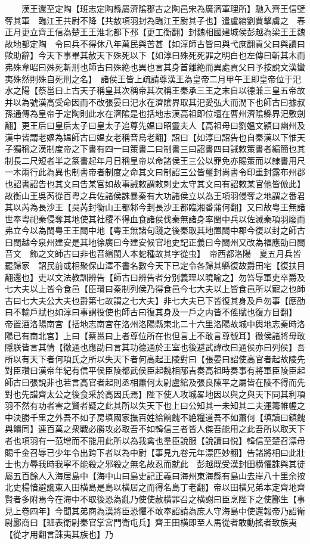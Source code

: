　　漢王還至定陶【班志定陶縣屬濟隂郡古之陶邑宋為廣濟軍理所】馳入齊王信壁奪其軍　臨江王共尉不降【共敖項羽封為臨江王尉其子也】遣盧綰劉賈擊虜之　春正月更立齊王信為楚王王淮北都下邳【更工衡翻】封魏相國建城侯彭越為梁王王魏故地都定陶　令曰兵不得休八年萬民與苦甚【如淳師古皆曰與弋庶翻貢父曰與讀曰歟助辭】今天下事畢其赦天下殊死以下【如淳曰殊死死罪之明白也左傳曰斬其木而弗殊韋昭曰殊死斬刑也師古曰殊絶也異也言其身首離絶而異處貢父曰予按說文漢蠻夷殊然則殊自死刑之名】　諸侯王皆上疏請尊漢王為皇帝二月甲午王即皇帝位于汜水之陽【蔡邕曰上古天子稱皇其次稱帝其次稱王秦承三王之末自以德兼三皇五帝故并以為號漢高受命因而不改張晏曰汜水在濟隂界取其汜愛弘大而潤下也師古曰據叔孫通傳為皇帝于定陶則此水在濟隂是也括地志漢高祖即位壇在曹州濟隂縣界汜敷劍翻】更王后曰皇后太子曰皇太子追尊先媪曰昭靈夫人【高祖母曰劉媼文頴曰幽州及漢中皆謂老嫗為媪師古曰媪女老稱音烏老翻】詔曰【如淳曰詔告也自秦漢以下惟天子獨稱之漢制度帝之下書有四一曰策書二曰制書三曰詔書四曰誡敕策書者編簡也其制長二尺短者半之篆書起年月日稱皇帝以命諸侯王三公以罪免亦賜策而以隸書用尺一木兩行此為異也制書帝者制度之命其文曰制詔三公皆璽封尚書令印重封露布州郡也詔書詔告也其文曰告某官如故事誡敕謂敕刺史太守其文曰有詔敕某官他皆倣此】故衡山王吳芮從百粤之兵佐諸侯誅暴秦有大功諸侯立以為王項羽侵奪之地謂之番君其以芮為長沙王【吳芮封衡山王都邾今刲長沙王都臨湘番蒲何翻】又曰故粤王無諸世奉粤祀秦侵奪其地使其社稷不得血食諸侯伐秦無諸身率閩中兵以佐滅秦項羽廢而弗立今以為閩粤王王閩中地【粤王無諸句踐之後秦取其地置閩中郡今復以封之師古曰閩越今泉州建安是其地徐廣曰今建安候官地史記正義曰今閩州又改為福應劭曰閩音文　飾之文師古曰非也音緡閩人本蛇種故其字從虫】　帝西都洛陽　夏五月兵皆罷歸家　詔民前或相聚保山澤不書名數今天下已定令各歸其縣復故爵田宅【復扶目翻還也】吏以文法教訓辨告【師古曰辨告者分别義理以曉喻之】勿笞辱軍吏卒爵及七大夫以上皆令食邑【臣瓚曰秦制列侯乃得食邑今七大夫以上皆食邑所以寵之也師古曰七大夫公大夫也爵第七故謂之七大夫】非七大夫已下皆復其身及戶勿事【應劭曰不輸戶賦也如淳曰事謂役使也師古曰復其身及一戶之内皆不傜賦也復方目翻】　帝置酒洛陽南宮【括地志南宮在洛州洛陽縣東北二十六里洛陽故城中輿地志秦時洛陽已有南北宮】上曰【蔡邕曰上者尊位所在也但言上不敢言尊號耳】徹侯諸將毋敢隱朕皆言其情【徹通也應劭曰言其功德通於王室也後避武諱改曰通侯亦曰列侯】吾所以有天下者何項氏之所以失天下者何高起王陵對曰【張晏曰詔使高官者起故陵先對臣瓚曰漢帝年紀有信平侯臣陵都武侯臣起魏相邴吉奏高祖時奏事有將軍臣陵臣起師古曰張說非也若言高官者起則丞相蕭何太尉盧綰及張良陳平之屬皆在陵不得而先對也先譜齊太公之後食采於高因氏焉】陛下使人攻城畧地因以與之與天下同其利項羽不然有功者害之賢者疑之此其所以失天下也上曰公知其一未知其二夫運籌帷幄之中決勝千里之外吾不如子房填國家撫百姓給餉餽不絶糧道吾不如蕭何【填讀曰鎮餽與饋同】連百萬之衆戰必勝攻必取吾不如韓信三者皆人傑吾能用之此吾所以取天下者也項羽有一范增而不能用此所以為我禽也羣臣說服【說讀曰悦】韓信至楚召漂母賜千金召辱已少年令出跨下者以為中尉【事見九卷元年漂匹妙翻】告諸將相曰此壯士也方辱我時我寜不能殺之邪殺之無名故忍而就此　彭越既受漢封田横懼誅與其徒屬五百餘人入海居島中【海中山曰島史記正義曰海州東海縣有島山去岸八十里余按北史楊愔避讒東入田横島是島以横居之而得名島丁老翻】帝以田横兄弟本定齊地齊賢者多附焉今在海中不取後恐為亂乃使使赦横罪召之横謝曰臣烹陛下之使酈生【事見上卷四年】今聞其弟商為漢將臣恐懼不敢奉詔請為庶人守海島中使還報帝乃詔衛尉酈商曰【班表衛尉秦官掌宮門衛屯兵】齊王田横即至人馬從者敢動搖者致族夷【從才用翻言誅夷其族也】乃